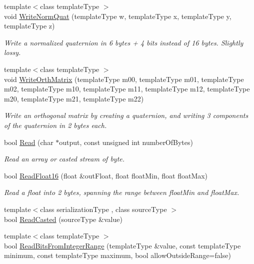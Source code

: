 \begin{DoxyCompactItemize}
{\footnotesize template$<$class template\-Type $>$ }\\void \hyperlink{class_rak_net_1_1_bit_stream_acb96f0dce8b1a864799d02211cf34d8b}{Write\-Norm\-Quat} (template\-Type w, template\-Type x, template\-Type y, template\-Type z)
\begin{DoxyCompactList}\small\item\em Write a normalized quaternion in 6 bytes + 4 bits instead of 16 bytes. Slightly lossy. \end{DoxyCompactList}\item 
{\footnotesize template$<$class template\-Type $>$ }\\void \hyperlink{class_rak_net_1_1_bit_stream_adb06e701aa336f41c314b88ae27c60bc}{Write\-Orth\-Matrix} (template\-Type m00, template\-Type m01, template\-Type m02, template\-Type m10, template\-Type m11, template\-Type m12, template\-Type m20, template\-Type m21, template\-Type m22)
\begin{DoxyCompactList}\small\item\em Write an orthogonal matrix by creating a quaternion, and writing 3 components of the quaternion in 2 bytes each. \end{DoxyCompactList}\item 
bool \hyperlink{class_rak_net_1_1_bit_stream_a25b53ddc6f6bc9a1e0c01cb677a3c6d1}{Read} (char $\ast$output, const unsigned int number\-Of\-Bytes)
\begin{DoxyCompactList}\small\item\em Read an array or casted stream of byte. \end{DoxyCompactList}\item 
bool \hyperlink{class_rak_net_1_1_bit_stream_af8275d390e2114d55449bb4ae2d01d62}{Read\-Float16} (float \&out\-Float, float float\-Min, float float\-Max)
\begin{DoxyCompactList}\small\item\em Read a float into 2 bytes, spanning the range between {\itshape float\-Min} and {\itshape float\-Max}. \end{DoxyCompactList}\item 
{\footnotesize template$<$class serialization\-Type , class source\-Type $>$ }\\bool \hyperlink{class_rak_net_1_1_bit_stream_aab282a3cea68401414d8569f997a5367}{Read\-Casted} (source\-Type \&value)
\item 
{\footnotesize template$<$class template\-Type $>$ }\\bool \hyperlink{class_rak_net_1_1_bit_stream_a620645af65289abfb244270261060df9}{Read\-Bits\-From\-Integer\-Range} (template\-Type \&value, const template\-Type minimum, const template\-Type maximum, bool allow\-Outside\-Range=false)

\end{DoxyCompactItemize}

